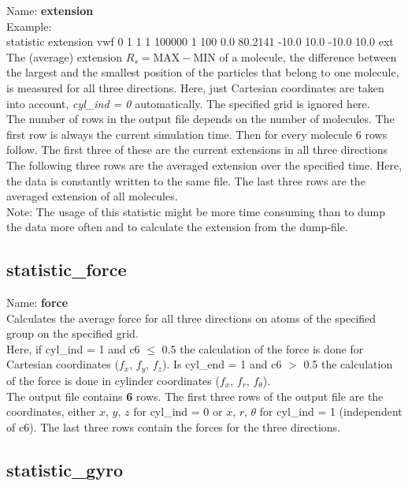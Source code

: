 \documentclass[a4paper,10pt]{scrreprt}
\begin{document}
Name: {\bfseries extension}
\\[2ex]
Example:
\\[0.5ex]
statistic       extension vwf 0 1 1 1 100000 1 100 0.0 80.2141 -10.0 10.0 -10.0 10.0 ext
\\[2ex]
The (average) extension $R_s = \mathrm{MAX} - \mathrm{MIN}$ of a molecule, the difference between the largest and the smallest position of the particles that belong to one molecule, is measured for all three directions.
Here, just Cartesian coordinates are taken into account, \textit{cyl\_ind = 0} automatically.
The specified grid is ignored here.
\\[2ex]
The number of rows in the output file depends on the number of molecules.
The first row is always the current simulation time.
Then for every molecule 6 rows follow.
The first three of these are the current extensions in all three directions
The following three rows are the averaged extension over the specified time.
Here, the data is constantly written to the same file.
The last three rows are the averaged extension of all molecules.
\\[2ex]
Note: The usage of this statistic might be more time consuming than to dump the data more often and to calculate the extension from the dump-file.


\subsection{statistic\_force}

Name: {\bfseries force}
\\[2ex]
Calculates the average force for all three directions on atoms of the specified group on the specified grid.
\\[2ex]
Here, if cyl\_ind = 1 and c6 $\le$ 0.5 the calculation of the force is done for Cartesian coordinates ($f_x$, $f_y$, $f_z$).
Is cyl\_end = 1 and c6 $>$ 0.5 the calculation of the force is done in cylinder coordinates ($f_x$, $f_r$, $f_{\theta}$).
\\[2ex]
The output file contains {\bfseries 6} rows.
The first three rows of the output file are the coordinates, either $x$, $y$, $z$ for cyl\_ind = 0 or $x$, $r$, $\theta$ for cyl\_ind = 1 (independent of c6).
The last three rows contain the forces for the three directions.


\subsection{statistic\_gyro}
\end{document}
